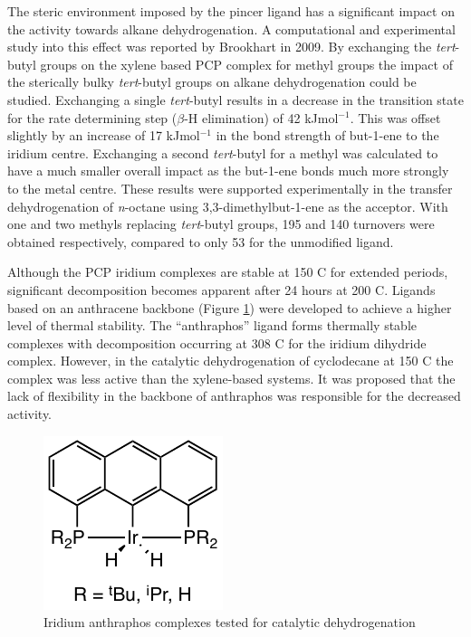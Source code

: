 The steric environment imposed by the pincer ligand has a significant impact on the activity towards alkane dehydrogenation.\cite{Choi2011}  A computational and experimental study into this effect was reported by Brookhart in 2009.\cite{Kundu2009}  By exchanging the \emph{tert}-butyl groups on the xylene based PCP complex for methyl groups the impact of the sterically bulky \emph{tert}-butyl groups on alkane dehydrogenation could be studied.  Exchanging a single \emph{tert}-butyl results in a decrease in the transition state for the rate determining step ($\beta$-H elimination) of 42 kJmol$^{-1}$.  This was offset slightly by an increase of 17 kJmol$^{-1}$ in the bond strength of but-1-ene to the iridium centre.  Exchanging a second \emph{tert}-butyl for a methyl was calculated to have a much smaller overall impact as the but-1-ene bonds much more strongly to the metal centre.\cite{Kundu2009}  These results were supported experimentally in the transfer dehydrogenation of \emph{n}-octane using 3,3-dimethylbut-1-ene as the acceptor.  With one and two methyls replacing \emph{tert}-butyl groups, 195 and 140 turnovers were obtained respectively, compared to only 53 for the unmodified ligand.\cite{Kundu2009}

Although the PCP iridium complexes are stable at 150 \degrees C for extended periods, significant decomposition becomes apparent after 24 hours at 200 \degrees C.\cite{Gupta1996}  Ligands based on an anthracene backbone (Figure \ref{Anthraphos}) were developed to achieve a higher level of thermal stability.\cite{Haenel2001}  The ``anthraphos'' ligand forms thermally stable complexes with decomposition occurring at 308 \degrees C for the iridium dihydride complex.  However, in the catalytic dehydrogenation of cyclodecane at 150 \degrees C the complex was less active than the xylene-based systems.  It was proposed that the lack of flexibility in the backbone of anthraphos was responsible for the decreased activity.\cite{Haenel2001}

\begin{figure}[ht]
\centering
\includegraphics[]{../Figures/Anthraphos.pdf}
\caption[Iridium anthraphos complexes tested for catalytic dehydrogenation]{Iridium anthraphos complexes tested for catalytic dehydrogenation}
\label{Anthraphos}
\end{figure}


